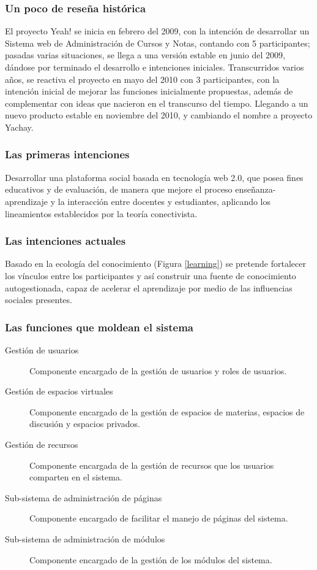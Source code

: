 \subsubsection{Un poco de rese\~na hist\'orica}
El proyecto Yeah! se inicia en febrero del 2009, con la intenci\'on de desarrollar un Sistema web de Administraci\'on de 
Cursos y Notas, contando con 5 participantes; pasadas varias situaciones, se llega a una versi\'on estable en junio del 2009,
d\'andose por terminado el desarrollo e intenciones iniciales.
Transcurridos varios a\~nos, se reactiva el proyecto en mayo del 2010 con 3 participantes, con la intenci\'on inicial de 
mejorar las funciones inicialmente propuestas, adem\'as de complementar con ideas que nacieron en el transcurso del tiempo.
Llegando a un nuevo producto estable en noviembre del 2010, y cambiando el nombre a proyecto Yachay.

\subsubsection{Las primeras intenciones}
Desarrollar una plataforma social basada en tecnolog\'ia web 2.0, que posea fines educativos y de evaluaci\'on, de manera que 
mejore el proceso ense\~nanza-aprendizaje y la interacci\'on entre docentes y estudiantes, aplicando los lineamientos 
establecidos por la teor\'ia conectivista.

\subsubsection{Las intenciones actuales}
Basado en la ecolog\'ia del conocimiento (Figura \ref{learning}) se pretende fortalecer los v\'inculos entre los participantes
y as\'i construir una fuente de conocimiento autogestionada,
capaz de acelerar el aprendizaje por medio de las influencias sociales presentes.

\subsubsection{Las funciones que moldean el sistema}
\begin{description}
    \item [Gesti\'on de usuarios] Componente encargado de la gesti\'on de usuarios y roles de usuarios.
    \item [Gesti\'on de espacios virtuales] Componente encargado de la gesti\'on de espacios de materias, espacios de discusi\'on y espacios privados.
    \item [Gesti\'on de recursos] Componente encargada de la gesti\'on de recursos que los usuarios comparten en el sistema.
    \item [Sub-sistema de administraci\'on de p\'aginas] Componente encargado de facilitar el manejo de p\'aginas del sistema.
    \item [Sub-sistema de administraci\'on de m\'odulos] Componente encargado de la gesti\'on de los m\'odulos del sistema.
\end{description}

